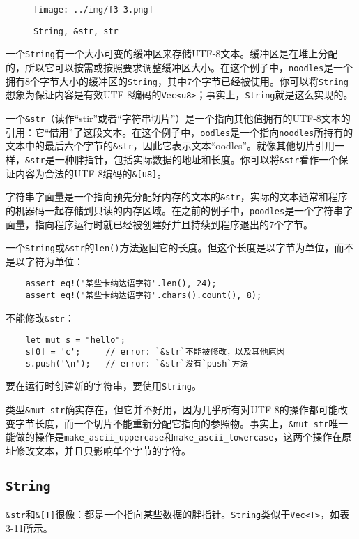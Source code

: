 \begin{figure}[htbp]
    \centering
    \texttt{[image: ../img/f3-3.png]}
    \caption{\texttt{String, \&str, str}}
    \label{f3-3}
\end{figure}

一个\texttt{String}有一个大小可变的缓冲区来存储UTF-8文本。缓冲区是在堆上分配的，所以它可以按需或按照要求调整缓冲区大小。在这个例子中，\texttt{noodles}是一个拥有8个字节大小的缓冲区的\texttt{String}，其中7个字节已经被使用。你可以将\texttt{String}想象为保证内容是有效UTF-8编码的\texttt{Vec<u8>}；事实上，\texttt{String}就是这么实现的。

一个\texttt{\&str}（读作“stir”或者“字符串切片”）是一个指向其他值拥有的UTF-8文本的引用：它“借用”了这段文本。在这个例子中，\texttt{oodles}是一个指向\texttt{noodles}所持有的文本中的最后六个字节的\texttt{\&str}，因此它表示文本“oodles”。就像其他切片引用一样，\texttt{\&str}是一种胖指针，包括实际数据的地址和长度。你可以将\texttt{\&str}看作一个保证内容为合法的UTF-8编码的\texttt{\&[u8]}。

字符串字面量是一个指向预先分配好内存的文本的\texttt{\&str}，实际的文本通常和程序的机器码一起存储到只读的内存区域。在之前的例子中，\texttt{poodles}是一个字符串字面量，指向程序运行时就已经被创建好并且持续到程序退出的7个字节。

一个\texttt{String}或\texttt{\&str}的\texttt{len()}方法返回它的长度。但这个长度是以字节为单位，而不是以字符为单位：
\begin{verbatim}
    assert_eq!("某些卡纳达语字符".len(), 24);
    assert_eq!("某些卡纳达语字符".chars().count(), 8);
\end{verbatim}

不能修改\texttt{\&str}：
\begin{verbatim}
    let mut s = "hello";
    s[0] = 'c';     // error: `&str`不能被修改，以及其他原因
    s.push('\n');   // error: `&str`没有`push`方法
\end{verbatim}

要在运行时创建新的字符串，要使用\texttt{String}。

类型\texttt{\&mut str}确实存在，但它并不好用，因为几乎所有对UTF-8的操作都可能改变字节长度，而一个切片不能重新分配它指向的参照物。事实上，\texttt{\&mut str}唯一能做的操作是\texttt{make\_ascii\_uppercase}和\texttt{make\_ascii\_lowercase}，这两个操作在原址修改文本，并且只影响单个字节的字符。

\subsection{\texttt{String}}
\texttt{\&str}和\texttt{\&[T]}很像：都是一个指向某些数据的胖指针。\texttt{String}类似于\texttt{Vec<T>}，如\hyperref[t3-11]{表3-11}所示。

